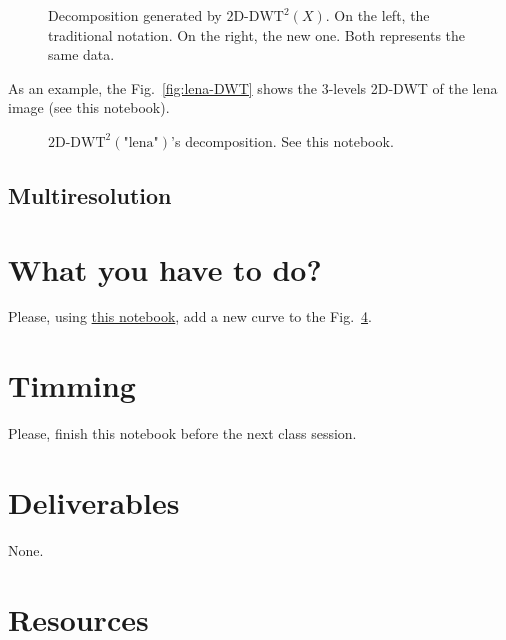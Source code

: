 \begin{figure}
  \centering
  \caption{Decomposition generated by $\text{2D-DWT}^2(X)$. On the
    left, the traditional notation. On the right, the new one. Both
    represents the same data.}
  \label{fig:2D-DWT}
\end{figure}

As an example, the Fig.~\ref{fig:lena-DWT} shows the $3$-levels
2D-DWT of the lena image (see this notebook).

\begin{figure}
  \centering
  \caption{$\text{2D-DWT}^2(\text{"lena"})$'s decomposition. See this
    notebook.}
  \label{fig:2D-DWT}
\end{figure}

\subsection{Multiresolution}

\section{What you have to do?}
  
Please, using \href{}{this notebook}, add a new curve to the Fig.~\ref{}.

\section{Timming}

Please, finish this notebook before the next class session.

\section{Deliverables}

None.

\section{Resources}


